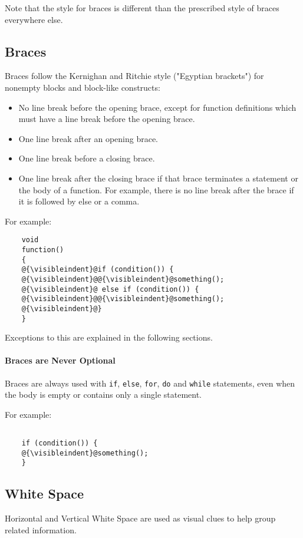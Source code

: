 \documentclass[fleqn,12pt]{PARCOneColumn} %
\newcommand{\visibleindent}{\textvisiblespace\textvisiblespace\textvisiblespace\textvisiblespace}
\begin{document}
Note that the style for braces is different than the prescribed style of braces everywhere else.

\subsection{Braces}
Braces follow the Kernighan and Ritchie style ("Egyptian brackets")
for nonempty blocks and block-like constructs:
\begin{itemize}
\item No line break before the opening brace,
except for function definitions which must have a line break before the opening brace.
\item One line break after an opening brace.
\item One line break before a closing brace.
\item One line break after the closing brace if that brace terminates a statement
or the body of a function.
For example, there is no line break after the brace if it is followed
by else or a comma.
\end{itemize}

For example:
\begin{lstlisting}
    void
    function()
    {
    @{\visibleindent}@if (condition()) {
    @{\visibleindent}@@{\visibleindent}@something();
    @{\visibleindent}@ else if (condition()) {
    @{\visibleindent}@@{\visibleindent}@something();
    @{\visibleindent}@}
    }
\end{lstlisting}

Exceptions to this are explained in the following sections.

\paragraph{Braces are Never Optional}
Braces are always used with {\tt if}, {\tt else}, {\tt for}, {\tt do} and {\tt while} statements,
even when the body is empty or contains only a single statement.

For example:
\begin{lstlisting}

    if (condition()) {
    @{\visibleindent}@something();
    }

\end{lstlisting}

\subsection{White Space}
Horizontal and Vertical White Space are used as visual clues to help group related information.
\end{document}
